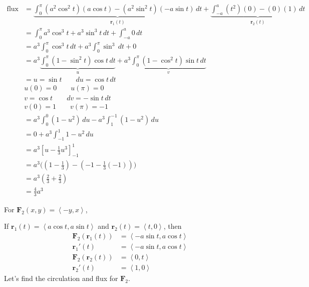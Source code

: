 \documentclass{article}
\newcommand{\lrp}[1]{\left( #1 \right)}
\newcommand{\lra}[1]{\left\langle #1 \right\rangle}
\newcommand{\lrb}[1]{\left[ #1 \right]}
\renewcommand{\r}[0]{\mathbf{r}}
\newcommand{\F}[0]{\mathbf{F}}
\begin{document}
\begin{align*}
    \text{flux}&=\underbrace{\int_0^\pi \lrp{a^2\cos ^2 t}\lrp{a\cos t}-\lrp{a^2\sin ^2 t}\lrp{-a \sin t}\,dt}_{\r_1(t)} + \underbrace{\int_{-a}^a \lrp{t^2}\lrp{0}-\lrp{0}\lrp{1}\,dt}_{\r_2(t)}\\
    &= \int_0^\pi a^3\cos^3 t + a^3 \sin ^3 t\,dt +\int_{-a}^a 0\,dt\\
    &=a^3\int_0^\pi \cos^3 t \,dt + a^3\int_0^\pi  \sin^3 \,dt + 0\\
    &=a^3\underbrace{\int_0^\pi \lrp{1-\sin^2 t}\cos t \,dt}_{u} +a^3\underbrace{\int_0^\pi \lrp{1-\cos^2 t }\sin t\,dt}_{v}\\
    &=u=\sin t\hspace{2em}du=\cos t\,dt\\
    &u(0)=0\hspace{2em}u(\pi)=0\\
    &v=\cos t \hspace{2em}dv=-\sin t\,dt\\
    &v(0)=1\hspace{2em}v(\pi)=-1\\
    &=a^3\int_0^0 (1-u^2)\,du -a^3\int_1^{-1}(1-u^2)\,du\\
    &=0 + a^3\int_{-1}^1 1-u^2\,du\\
    &=a^3\lrb{u-\frac{1}{3}u^3}_{-1}^1\\
    &=a^3\Bigg(\lrp{1-\frac{1}{3}}-\lrp{-1-\frac{1}{3}(-1)}\Bigg)\\
    &=a^3\lrp{\frac{2}{3}+\frac{2}{3}}\\
    &=\frac{4}{3}a^3
\end{align*}

{}
For $\F_2(x,y)=\lra{-y,x}$,

If $\r_1(t)=\lra{a\cos t, a\sin t}$ and $\r_2 (t)=\lra{t,0}$, then
\begin{align*}
    \F_2\lrp{\r_1(t)}&=\lra{-a\sin t, a \cos t}\\
    \r_1'(t)&=\lra{-a \sin t ,a \cos t}\\
    \F_2\lrp{\r_2(t)}&=\lra{0, t}\\
    \r_2'(t)&=\lra{1,0}
\end{align*}
Let's find the circulation and flux for $\F_2$.
\end{document}
